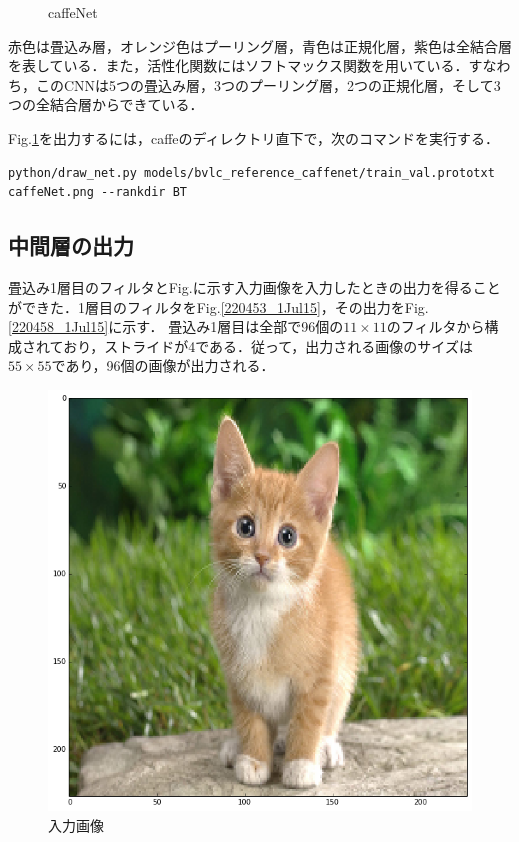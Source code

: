 \documentclass[a4paper,10pt]{jsarticle}
\begin{document}
\begin{figure}[t]
  \caption{caffeNet}
  \label{204941_1Jul15}
\end{figure}
赤色は畳込み層，オレンジ色はプーリング層，青色は正規化層，紫色は全結合層を表している．また，活性化関数にはソフトマックス関数を用いている．すなわち，このCNNは5つの畳込み層，3つのプーリング層，2つの正規化層，そして3つの全結合層からできている．

Fig.\ref{204941_1Jul15}を出力するには，caffeのディレクトリ直下で，次のコマンドを実行する．
\begin{lstlisting}[basicstyle=\ttfamily\footnotesize, frame=single,breaklines = true]
python/draw_net.py models/bvlc_reference_caffenet/train_val.prototxt caffeNet.png --rankdir BT
\end{lstlisting}

\subsection{中間層の出力}
畳込み1層目のフィルタとFig.に示す入力画像を入力したときの出力を得ることができた．1層目のフィルタをFig.\ref{220453_1Jul15}，その出力をFig.\ref{220458_1Jul15}に示す．
畳込み1層目は全部で96個の$11\times11$のフィルタから構成されており，ストライドが4である．従って，出力される画像のサイズは$55\times55$であり，96個の画像が出力される．
\begin{figure}[t]
 \centering
 \includegraphics[scale=0.5]{fig/png/input.png}
  \caption{入力画像}
\end{figure}
\end{document}
